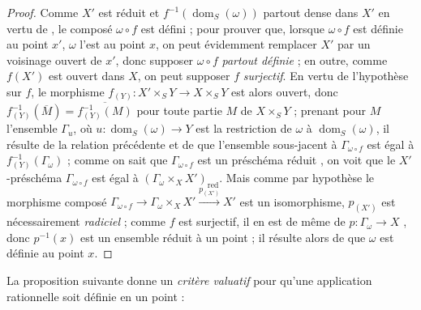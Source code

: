 \begin{proof}
Comme $X'$ est réduit et $f^{-1}(\operatorname{dom}_S(\omega))$ partout dense dans $X'$ en vertu de , le composé $\omega\circ f$ est défini ; pour prouver que, lorsque $\omega\circ f$ est définie au point $x'$, $\omega$ l'est au point $x$, on peut évidemment remplacer $X'$ par un voisinage ouvert de $x'$, donc supposer $\omega\circ f$ \emph{partout définie} ; en outre, comme $f(X')$ est ouvert dans $X$, on peut supposer $f$ \emph{surjectif}.
En vertu de l'hypothèse sur $f$, le morphisme $f_{(Y)}:X'\times_S Y\to X\times_S Y$ est alors ouvert, donc $f_{(Y)}^{-1}(\overline{M})=\overline{f_{(Y)}^{-1}(M)}$ pour toute partie $M$ de $X\times_S Y$ ; prenant pour $M$ l'ensemble $\Gamma_u$, où $u:\operatorname{dom}_S(\omega)\to Y$ est la restriction de $\omega$ à $\operatorname{dom}_S(\omega)$, il résulte de la relation précédente et de  que l'ensemble sous-jacent à $\Gamma_{\omega\circ f}$ est égal à $f_{(Y)}^{-1}(\Gamma_\omega)$ ; comme on sait
que $\Gamma_{\omega\circ f}$ est un préschéma réduit , on voit que le $X'$-préschéma $\Gamma_{\omega\circ f}$ est égal à $(\Gamma_\omega\times_X X')_\mathrm{red}$.
Mais comme par hypothèse le morphisme composé $\Gamma_{\omega\circ f}\to\Gamma_\omega\times_X X'\xrightarrow{p_{(X')}}X'$ est un isomorphisme, $p_{(X')}$ est nécessairement \emph{radiciel} ; comme $f$ est surjectif, il en est de même de $p:\Gamma_\omega\to X$ , donc $p^{-1}(x)$ est un ensemble réduit à un point  ; il résulte alors de  que $\omega$ est définie au point $x$.
\end{proof}

La proposition suivante donne un \emph{critère valuatif} pour qu'une application rationnelle soit définie en un point :

